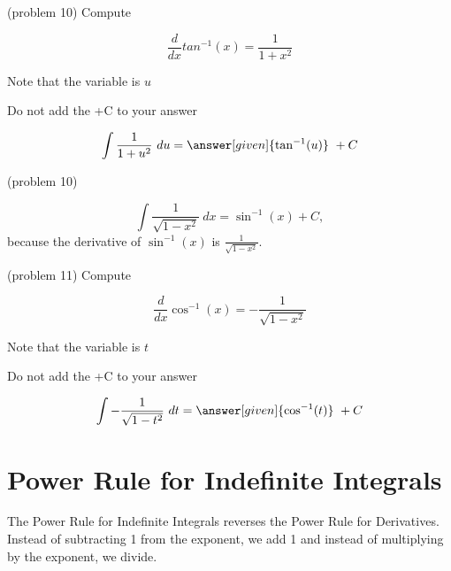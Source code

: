 \documentclass{ximera}
\begin{document}
\begin{problem} (problem 10) %
Compute 

\begin{hint}
\[
\frac{d}{dx} tan^{-1}(x) = \frac{1}{1+x^2}
\]
\end{hint}
\begin{hint}
Note that the variable is $u$
\end{hint}
\begin{hint}
\begin{center}
Do not add the +C to your answer
\end{center}
\end{hint}

\[
\int \frac{1}{1+u^2} \ du =
\answer[given]{\tan^{-1}(u)} \ + C
\]
\end{problem}(problem 10)


\begin{example}[example 11]
\[
\int \frac{1}{\sqrt{1 - x^2}} \ dx = \sin^{-1}(x) + C,
\]
because the derivative of $\sin^{-1}(x)$ 
is $\frac{1}{\sqrt{1 - x^2}}$.

\end{example}

\begin{problem}(problem 11)
Compute 

\begin{hint}
\[
\frac{d}{dx} \cos^{-1}(x) = -\frac{1}{\sqrt{1 - x^2}}
\]
\end{hint}
\begin{hint}
Note that the variable is $t$
\end{hint}
\begin{hint}
\begin{center}
Do not add the +C to your answer
\end{center}
\end{hint}

\[
\int -\frac{1}{\sqrt{1 - t^2}} \ dt =
\answer[given]{\cos^{-1}(t)} \ + C
\]
\end{problem}

\section{Power Rule for Indefinite Integrals}

The Power Rule for Indefinite Integrals reverses the Power Rule for Derivatives.
Instead of subtracting 1 from the exponent, we add 1 and instead of multiplying by the exponent, we divide.
\end{document}
